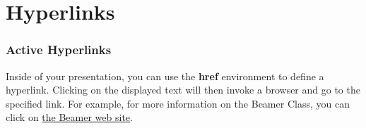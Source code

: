 \documentclass{beamer}
\begin{document}
  \section{Hyperlinks}
  \frame
  {
    \frametitle{Active Hyperlinks}

    Inside of your presentation,  you can use the {\bf{href}} environment
    to define a hyperlink.  Clicking on the displayed text will then invoke
    a browser and go to the specified link.
\vskip 0.1in
    For example, for more information on the Beamer Class, you can click on
    \href{https://bitbucket.org/rivanvx/beamer/wiki/Home}{{\alert{the Beamer web site}}}.

  }
\end{document}
